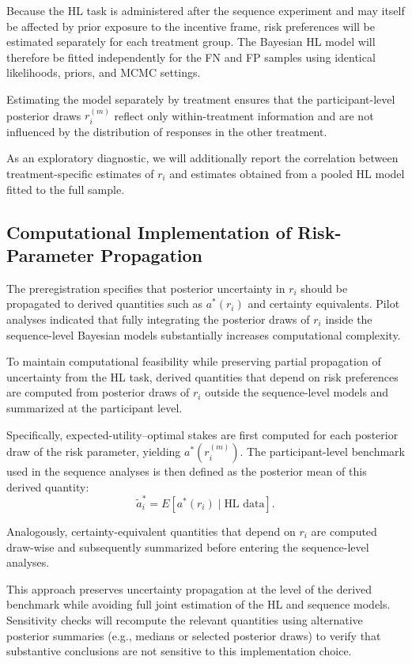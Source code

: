 \documentclass[11pt,a4paper]{article}
\numberwithin{equation}{section}
\begin{document}
Because the HL task is administered after the sequence experiment and may
itself be affected by prior exposure to the incentive frame, risk
preferences will be estimated separately for each treatment group.
The Bayesian HL model will therefore be fitted independently for the
FN and FP samples using identical likelihoods, priors, and MCMC settings.

Estimating the model separately by treatment ensures that the
participant-level posterior draws $r_i^{(m)}$ reflect only
within-treatment information and are not influenced by the distribution
of responses in the other treatment.

As an exploratory diagnostic, we will additionally report the correlation
between treatment-specific estimates of $r_i$ and estimates obtained
from a pooled HL model fitted to the full sample.

\subsection{Computational Implementation of Risk-Parameter Propagation}

The preregistration specifies that posterior uncertainty in $r_i$ should
be propagated to derived quantities such as $a^*(r_i)$ and certainty
equivalents. Pilot analyses indicated that fully integrating the
posterior draws of $r_i$ inside the sequence-level Bayesian models
substantially increases computational complexity.

To maintain computational feasibility while preserving partial
propagation of uncertainty from the HL task, derived quantities that
depend on risk preferences are computed from posterior draws of $r_i$
outside the sequence-level models and summarized at the participant
level.

Specifically, expected-utility--optimal stakes are first computed for
each posterior draw of the risk parameter, yielding $a^*(r_i^{(m)})$.
The participant-level benchmark used in the sequence analyses is then
defined as the posterior mean of this derived quantity:
\[
\tilde a_i^* = E[a^*(r_i)\mid \text{HL data}].
\]

Analogously, certainty-equivalent quantities that depend on $r_i$ are
computed draw-wise and subsequently summarized before entering the
sequence-level analyses.

This approach preserves uncertainty propagation at the level of the
derived benchmark while avoiding full joint estimation of the HL and
sequence models. Sensitivity checks will recompute the relevant
quantities using alternative posterior summaries (e.g., medians or
selected posterior draws) to verify that substantive conclusions are not
sensitive to this implementation choice.
\end{document}
